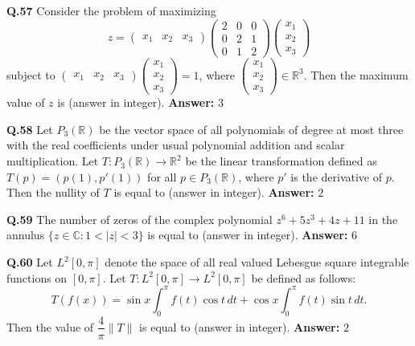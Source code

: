 \documentclass[11pt,a4paper]{article}
\newcommand{\ans}[1]{\textbf{Answer:} #1\par\medskip}
\begin{document}
\textbf{Q.57} Consider the problem of maximizing
\[
  z = \begin{pmatrix} x_1 & x_2 & x_3 \end{pmatrix} \begin{pmatrix} 2 & 0 & 0 \\ 0 & 2 & 1 \\ 0 & 1 & 2 \end{pmatrix} \begin{pmatrix} x_1 \\ x_2 \\ x_3 \end{pmatrix}
\]
subject to $\begin{pmatrix} x_1 & x_2 & x_3 \end{pmatrix} \begin{pmatrix} x_1 \\ x_2 \\ x_3 \end{pmatrix} = 1$, where $\begin{pmatrix} x_1 \\ x_2 \\ x_3 \end{pmatrix} \in \mathbb{R}^3$. Then the maximum value of $z$ is \underline{\hspace{2cm}} (answer in integer).
\ans{$3$}

\textbf{Q.58} Let $P_3(\mathbb{R})$ be the vector space of all polynomials of degree at most three with the real coefficients under usual polynomial addition and scalar multiplication. Let $T : P_3(\mathbb{R}) \to \mathbb{R}^2$ be the linear transformation defined as $T(p) = (p(1), p'(1))$ for all $p \in P_3(\mathbb{R})$, where $p'$ is the derivative of $p$. Then the nullity of $T$ is equal to \underline{\hspace{2cm}} (answer in integer).
\ans{$2$}

\textbf{Q.59} The number of zeros of the complex polynomial $z^6 + 5z^3 + 4z + 11$ in the annulus $\{z \in \mathbb{C} : 1 < |z| < 3\}$ is equal to \underline{\hspace{2cm}} (answer in integer).
\ans{$6$}

\textbf{Q.60} Let $L^2[0, \pi]$ denote the space of all real valued Lebesgue square integrable functions on $[0, \pi]$. Let $T : L^2[0, \pi] \to L^2[0, \pi]$ be defined as follows:
\[
  T(f(x)) = \sin x \int_0^\pi f(t)\cos t\,dt + \cos x \int_0^\pi f(t)\sin t\,dt.
\]
Then the value of $\dfrac{4}{\pi}\|T\|$ is equal to \underline{\hspace{2cm}} (answer in integer).
\ans{$2$}
\end{document}
